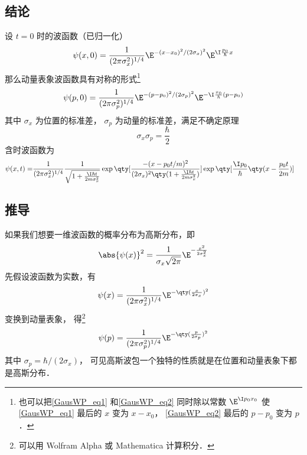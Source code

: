 


\subsection{结论}
设 $t = 0$ 时的波函数（已归一化）
\begin{equation}\label{GausWP_eq1}
\psi (x,0) = \frac{1}{(2\pi\sigma_x ^2)^{1/4}} \E^{-(x - x_0)^2/(2\sigma_x)^2} \E^{\I \frac{p_0}{\hbar}x}
\end{equation}
那么动量表象波函数具有对称的形式\footnote{也可以把\autoref{GausWP_eq1} 和\autoref{GausWP_eq2} 同时除以常数 $\E^{\I p_0 x_0}$ 使\autoref{GausWP_eq1} 最后的 $x$ 变为 $x-x_0$， \autoref{GausWP_eq2} 最后的 $p-p_0$ 变为 $p$． }
\begin{equation}\label{GausWP_eq2}
\psi (p,0) = \frac{1}{(2\pi\sigma_p^2)^{1/4}} \E^{-(p - p_0)^2/(2\sigma_p)^2} \E^{-\I\frac{x_0}{\hbar }(p - p_0)}
\end{equation}
其中 $\sigma_x$ 为位置的标准差， $\sigma_p$ 为动量的标准差，满足不确定原理
\begin{equation}
\sigma_x\sigma_p = \frac{\hbar}{2}
\end{equation}
含时波函数为
\begin{equation}\begin{aligned}
\psi (x,t) = &\frac{1}{(2\pi\sigma_x^2)^{1/4}} \frac{1}{\sqrt{1 + \frac{\I\hbar t}{2m \sigma_x^2}}}
\exp\qty[\frac{-(x - p_0 t/m)^2}{(2\sigma_x )^2 \qty(1 + \frac{\I\hbar t}{2m \sigma_x^2})}] \exp\qty[\frac{\I p_0}{\hbar } \qty(x - \frac{p_0 t}{2m})]
\end{aligned}\end{equation}

\subsection{推导}

如果我们想要一维波函数的概率分布为高斯分布，即
\begin{equation}
\abs{\psi (x)}^2 = \frac{1}{\sigma_x \sqrt{2\pi}} \E^{-\frac{x^2}{2\sigma_x^2}}
\end{equation}
先假设波函数为实数，有
\begin{equation}
\psi (x) = \frac{1}{(2\pi\sigma_x^2)^{1/4}} \E^{-\qty(\frac{x}{2\sigma_x})^2}
\end{equation}
变换到动量表象，%
得\footnote{可以用 Wolfram Alpha 或 Mathematica 计算积分．}
\begin{equation}
\psi(p) = \frac{1}{(2\pi\sigma_p^2)^{1/4}} \E^{-\qty(\frac{p}{2\sigma_p})^2}
\end{equation}
其中 $\sigma_p = \hbar/(2\sigma_x)$， 可见高斯波包一个独特的性质就是在位置和动量表象下都是高斯分布．

